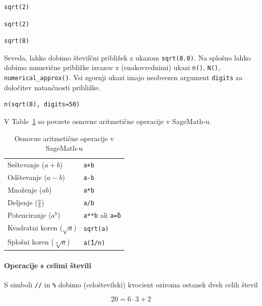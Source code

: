 \begin{verbatim}
sqrt(2)
\end{verbatim}

\begin{verbatim}
sqrt(2)
\end{verbatim}

\begin{verbatim}
sqrt(8)
\end{verbatim}

Seveda, lahko dobimo številčni približek z ukazom \texttt{sqrt(8.0)}. Na splošno lahko dobimo numerične približke izrazov z (enakovrednimi) ukazi \texttt{n()}, \texttt{N()}, \texttt{numerical\_approx()}. Vsi zgornji ukazi imajo neobvezen argument \texttt{digits} za določitev natančnosti približke.

\begin{verbatim}
n(sqrt(8), digits=50)
\end{verbatim}

V Table~\ref{tab-operacije} so povzete osnovne aritmetične operacije v SageMath-u.

\begin{table}
\centering
\caption[]{Osnovne aritmetične operacije v SageMath-u}
\label{tab-operacije}
\begin{tabular}{p{}p{}}
\toprule
Seštevanje ($a+b$) & \texttt{a+b} \\
Odštevanje ($a -b$) & \texttt{a-b} \\
Množenje ($ab$) & \texttt{a*b} \\
Deljenje ($\frac{a}{b}$) & \texttt{a/b} \\
Potenciranje ($a^b$) & \texttt{a**b} ali \texttt{a\^=b} \\
Kvadratni koren ($\sqrt{a}$) & \texttt{sqrt(a)} \\
Splošni koren ($\sqrt[n]{a}$) & \texttt{a\^(1/n)} \\
\bottomrule
\end{tabular}
\end{table}

\paragraph{Operacije s celimi števili}

S simboli \texttt{//} in \texttt{\%} dobimo (celoštevilski) kvocient oziroma ostanek dveh celih števil

\begin{equation}
20 = 6 \cdot 3 + 2
\end{equation}

